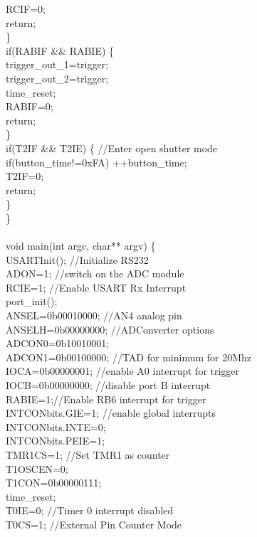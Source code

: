 \tabto*{1cm} RCIF=0;\\
\tabto*{1cm} return;\\
\tabto*{.5cm} \}\\
\tabto*{.5cm} if(RABIF \&\& RABIE) \{ \\ 
\tabto*{.5cm} trigger\_out\_1=trigger;\\
\tabto*{.5cm} trigger\_out\_2=trigger;\\
\tabto*{.5cm} time\_reset;\\
\tabto*{.5cm} RABIF=0;\\
\tabto*{.5cm} return;\\
\tabto*{.5cm} \}\\
\tabto*{.5cm} if(T2IF \&\& T2IE) \{  \tabto*{7.5cm} //Enter open shutter mode\\
\tabto*{.5cm} if(button\_time!=0xFA) ++button\_time;\\
\tabto*{.5cm} T2IF=0;\\
\tabto*{.5cm} return;\\
\tabto*{.5cm} \}\\
\}\\
\\
void main(int argc, char** argv) \{\\
\tabto*{.5cm} USARTInit(); \tabto*{7.5cm}  //Initialize RS232\\
\tabto*{.5cm} ADON=1; \tabto*{7.5cm} //switch on the ADC module\\
\tabto*{.5cm} RCIE=1;  \tabto*{7.5cm}  //Enable USART Rx Interrupt\\
\tabto*{.5cm} port\_init();\\
\tabto*{.5cm} ANSEL=0b00010000; \tabto*{7.5cm} //AN4 analog pin\\
\tabto*{.5cm} ANSELH=0b00000000;\tabto*{7.5cm} //ADConverter options\\
\tabto*{.5cm} ADCON0=0b10010001;\\
\tabto*{.5cm} ADCON1=0b00100000;\tabto*{7.5cm}  //TAD for minimum for 20Mhz\\
\tabto*{.5cm} IOCA=0b00000001; \tabto*{7.5cm} //enable A0 interrupt for trigger\\
\tabto*{.5cm} IOCB=0b00000000; \tabto*{7.5cm} //disable port B interrupt\\
\tabto*{.5cm} RABIE=1;\tabto*{7.5cm}//Enable RB6 interrupt for trigger\\
\tabto*{.5cm} INTCONbits.GIE=1;\tabto*{7.5cm}  //enable global interrupts\\
\tabto*{.5cm} INTCONbits.INTE=0;\\
\tabto*{.5cm} INTCONbits.PEIE=1;\\
\tabto*{.5cm} TMR1CS=1; \tabto*{7.5cm}  //Set TMR1 as counter\\
\tabto*{.5cm} T1OSCEN=0;\\
\tabto*{.5cm} T1CON=0b00000111;\\
\tabto*{.5cm} time\_reset;\\
\tabto*{.5cm} T0IE=0;\tabto*{7.5cm} //Timer 0 interrupt disabled\\
\tabto*{.5cm} T0CS=1;\tabto*{7.5cm} //External Pin Counter Mode\\

